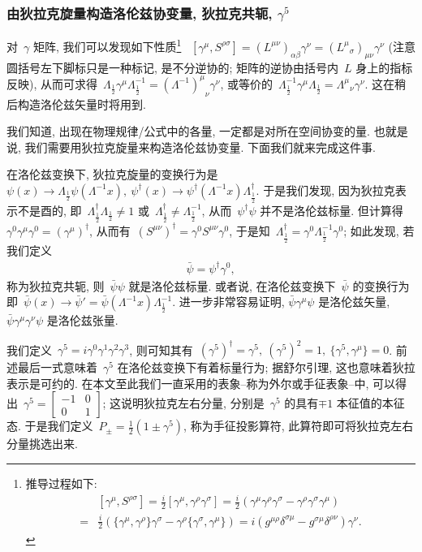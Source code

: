 \subsubsection{由狄拉克旋量构造洛伦兹协变量, 狄拉克共轭, $\gamma^5$}

对~$\gamma$ 矩阵, 我们可以发现如下性质\footnote{推导过程如下:
\begin{align}
&[\gamma^\mu,S^{\rho\sigma}]=\frac{i}{2}[\gamma^\mu,\gamma^\rho\gamma^\sigma]=\frac{i}{2}(\gamma^\mu\gamma^\rho\gamma^\sigma-\gamma^\rho\gamma^\sigma\gamma^\mu)\nonumber\\
=&\frac{i}{2}(\{\gamma^\mu,\gamma^\rho\}\gamma^\sigma-\gamma^\rho\{\gamma^\sigma,\gamma^\mu\})=i(g^{\mu\rho}\delta^{\sigma\mu}-g^{\sigma\mu}\delta^{\rho\nu})\gamma^\nu.
\end{align}
} ~$[\gamma^\mu,S^{\rho\sigma}]={(L^{\mu\nu})}_{\alpha\beta}\gamma^\nu={({L^\mu}_\sigma)}_{\mu\nu}\gamma^\nu$ (注意圆括号左下脚标只是一种标记, 是不分逆协的; 矩阵的逆协由括号内~$L$ 身上的指标反映), 从而可求得~$\Lambda_{\frac{1}{2}}\gamma^\mu\Lambda^{-1}_{\frac{1}{2}}={(\Lambda^{-1})^\mu}_\nu \gamma^\nu$, 或等价的~$\Lambda^{-1}_{\frac{1}{2}}\gamma^\mu\Lambda_{\frac{1}{2}}={\Lambda^\mu}_\nu \gamma^\nu$. 这在稍后构造洛伦兹矢量时将用到.

我们知道, 出现在物理规律/公式中的各量, 一定都是对所在空间协变的量. 也就是说, 我们需要用狄拉克旋量来构造洛伦兹协变量. 下面我们就来完成这件事.

在洛伦兹变换下, 狄拉克旋量的变换行为是~$\psi(x)\rightarrow\Lambda_{\frac{1}{2}}\psi(\Lambda^{-1}x),~\psi^\dag(x)\rightarrow\psi^\dag(\Lambda^{-1}x)\Lambda^\dag_{\frac{1}{2}}$. 于是我们发现, 因为狄拉克表示不是酉的, 即~$\Lambda^{\dag}_{\frac{1}{2}}\Lambda_{\frac{1}{2}}\neq1$ 或~$\Lambda^{\dag}_{\frac{1}{2}}\neq\Lambda^{-1}_{\frac{1}{2}}$, 从而~$\psi^\dag\psi$ 并不是洛伦兹标量. 但计算得~$\gamma^0\gamma^\mu\gamma^0=(\gamma^\mu)^\dag$, 从而有~$(S^{\mu\nu})^\dag=\gamma^0S^{\mu\nu}\gamma^0$, 于是知~$\Lambda^{\dag}_{\frac{1}{2}}=\gamma^0\Lambda^{-1}_{\frac{1}{2}}\gamma^0$; 如此发现, 若我们定义
\begin{align}
\bar{\psi}=\psi^\dag\gamma^0,
\end{align}
称为狄拉克共轭, 则~$\bar{\psi}\psi$ 就是洛伦兹标量. 或者说, 在洛伦兹变换下~$\bar{\psi}$ 的变换行为即~$\bar{\psi}(x)\rightarrow\bar{\psi}'=\bar{\psi}(\Lambda^{-1}x)\Lambda^{-1}_{\frac{1}{2}}$. 进一步非常容易证明, $\bar{\psi}\gamma^\mu\psi$ 是洛伦兹矢量, $\bar{\psi}\gamma^\mu\gamma^\nu\psi$ 是洛伦兹张量.

我们定义~$\gamma^5=i\gamma^0\gamma^1\gamma^2\gamma^3$, 则可知其有~$(\gamma^5)^\dag=\gamma^5,~(\gamma^5)^2=1,~\{\gamma^5,\gamma^\mu\}=0$. 前述最后一式意味着~$\gamma^5$ 在洛伦兹变换下有着标量行为; 据舒尔引理, 这也意味着狄拉表示是可约的. 在本文至此我们一直采用的表象--称为外尔或手征表象--中, 可以得出~$\gamma^5=\left[\begin{array}{cc}-1&0\\0&1\end{array}\right]$; 这说明狄拉克左右分量, 分别是~$\gamma^5$ 的具有$\mp1$ 本征值的本征态. 于是我们定义~$P_{\pm}=\frac{1}{2}(1\pm\gamma^5)$, 称为手征投影算符, 此算符即可将狄拉克左右分量挑选出来.

